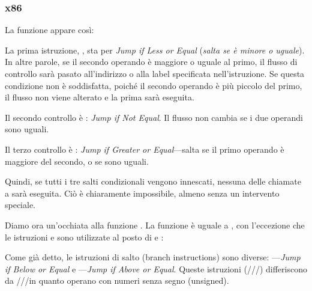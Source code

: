 \subsubsection{x86}


La funzione  appare così:




La prima istruzione, \JLE, sta per \emph{Jump if Less or Equal} (\emph{salta se è minore o uguale}). 
In altre parole, se il secondo operando è
maggiore o uguale al primo, il flusso di controllo sarà pasato all'indirizzo o alla label specificata nell'istruzione. 
Se questa condizione non è soddisfatta, poiché il secondo operando è più piccolo del primo, il flusso non viene alterato e la prima \printf sarà eseguita.

Il secondo controllo è \JNE: \emph{Jump if Not Equal}.
Il flusso non cambia se i due operandi sono uguali.

Il terzo controllo è \JGE: \emph{Jump if Greater or Equal}---salta se il primo operando è maggiore del secondo, o se sono uguali.

Quindi, se tutti i tre salti condizionali vengono innescati, nessuna delle chiamate a \printf sarà eseguita.
Ciò è chiaramente impossibile, almeno senza un intervento speciale.

Diamo ora un'occhiata alla funzione .
La funzione  è uguale a , con l'eccezione che le istruzioni \JBE e \JAE
sono utilizzate al posto di \JLE e \JGE:




Come già detto, le istruzioni di salto (branch instructions) sono diverse:
\JBE---\emph{Jump if Below or Equal} e \JAE---\emph{Jump if Above or Equal}.
Queste istruzioni (/\JAE/\JB/\JBE) differiscono da \JG/\JGE/\JL/\JLE in quanto operano con numeri senza segno (unsigned).


